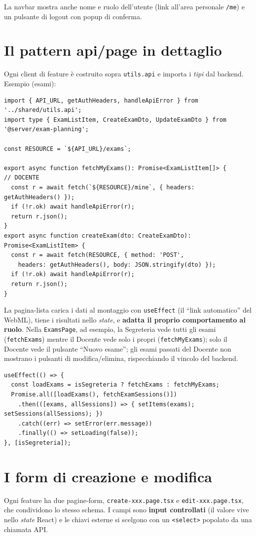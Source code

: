 \documentclass[11pt,a4paper,oneside]{report}
\newcommand{\code}[1]{\texttt{\small #1}}
\newcommand{\file}[1]{\texttt{\small #1}}
\begin{document}
La navbar mostra anche nome e ruolo dell'utente (link all'area personale
\code{/me}) e un pulsante di logout con popup di conferma.

\section{Il pattern api/page in dettaglio}
Ogni client di feature è costruito sopra \code{utils.api} e importa i \emph{tipi}
dal backend. Esempio (esami):

\begin{lstlisting}[caption={\file{exams.api.ts} (estratto).}]
import { API_URL, getAuthHeaders, handleApiError } from '../shared/utils.api';
import type { ExamListItem, CreateExamDto, UpdateExamDto } from '@server/exam-planning';

const RESOURCE = `${API_URL}/exams`;

export async function fetchMyExams(): Promise<ExamListItem[]> {        // DOCENTE
  const r = await fetch(`${RESOURCE}/mine`, { headers: getAuthHeaders() });
  if (!r.ok) await handleApiError(r);
  return r.json();
}
export async function createExam(dto: CreateExamDto): Promise<ExamListItem> {
  const r = await fetch(RESOURCE, { method: 'POST',
    headers: getAuthHeaders(), body: JSON.stringify(dto) });
  if (!r.ok) await handleApiError(r);
  return r.json();
}
\end{lstlisting}

La pagina-lista carica i dati al montaggio con \code{useEffect} (il ``link
automatico'' del WebML), tiene i risultati nello \emph{state}, e \textbf{adatta
il proprio comportamento al ruolo}. Nella \code{ExamsPage}, ad esempio, la
Segreteria vede tutti gli esami (\code{fetchExams}) mentre il Docente vede solo i
propri (\code{fetchMyExams}); solo il Docente vede il pulsante ``Nuovo esame'';
gli esami passati del Docente non mostrano i pulsanti di modifica/elimina,
rispecchiando il vincolo del backend.

\begin{lstlisting}[caption={Caricamento condizionato al ruolo (estratto di \file{exams.page.tsx}).}]
useEffect(() => {
  const loadExams = isSegreteria ? fetchExams : fetchMyExams;
  Promise.all([loadExams(), fetchExamSessions()])
    .then(([exams, allSessions]) => { setItems(exams); setSessions(allSessions); })
    .catch((err) => setError(err.message))
    .finally(() => setLoading(false));
}, [isSegreteria]);
\end{lstlisting}

\section{I form di creazione e modifica}
Ogni feature ha due pagine-form, \file{create-xxx.page.tsx} e
\file{edit-xxx.page.tsx}, che condividono lo stesso schema. I campi sono
\textbf{input controllati} (il valore vive nello \emph{state} React) e le chiavi
esterne si scelgono con un \code{<select>} popolato da una chiamata API.
\end{document}
